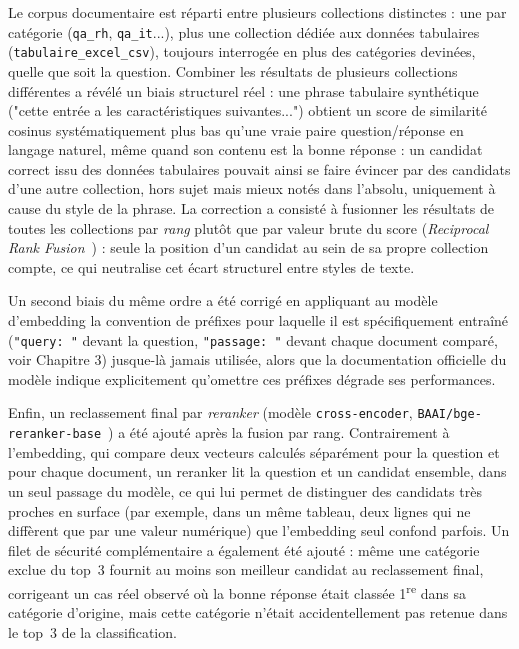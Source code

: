 \documentclass[12pt,a4paper]{report}
\begin{document}
Le corpus documentaire est réparti entre plusieurs collections
distinctes : une par catégorie (\texttt{qa\_rh}, \texttt{qa\_it}...),
plus une collection dédiée aux données tabulaires
(\texttt{tabulaire\_excel\_csv}), toujours interrogée en plus des
catégories devinées, quelle que soit la question. Combiner les
résultats de plusieurs collections différentes a révélé un biais
structurel réel : une phrase tabulaire synthétique ("cette entrée a les
caractéristiques suivantes...") obtient un score de similarité cosinus
systématiquement plus bas qu'une vraie paire question/réponse en
langage naturel, même quand son contenu est la bonne réponse : un
candidat correct issu des données tabulaires pouvait ainsi se faire
évincer par des candidats d'une autre collection, hors sujet mais mieux
notés dans l'absolu, uniquement à cause du style de la phrase. La
correction a consisté à fusionner les résultats de toutes les
collections par \emph{rang} plutôt que par valeur brute du score
(\emph{Reciprocal Rank Fusion}~\cite{rrf}) : seule la position d'un candidat au
sein de sa propre collection compte, ce qui neutralise cet écart
structurel entre styles de texte.

Un second biais du même ordre a été corrigé en appliquant au modèle
d'embedding la convention de préfixes pour laquelle il est
spécifiquement entraîné (\texttt{"query: "} devant la question,
\texttt{"passage: "} devant chaque document comparé, voir Chapitre 3) 
jusque-là jamais utilisée, alors que la documentation officielle du
modèle indique explicitement qu'omettre ces préfixes dégrade ses
performances.

Enfin, un reclassement final par \emph{reranker} (modèle
\texttt{cross-encoder}, \texttt{BAAI/bge-reranker-base}~\cite{bge}) a été ajouté
après la fusion par rang. Contrairement à l'embedding, qui compare deux
vecteurs calculés séparément pour la question et pour chaque document,
un reranker lit la question et un candidat ensemble, dans un seul
passage du modèle, ce qui lui permet de distinguer des candidats très
proches en surface (par exemple, dans un même tableau, deux lignes qui
ne diffèrent que par une valeur numérique) que l'embedding seul confond
parfois. Un filet de sécurité complémentaire a également été ajouté :
même une catégorie exclue du top~3 fournit au moins son meilleur
candidat au reclassement final, corrigeant un cas réel observé où la
bonne réponse était classée 1\textsuperscript{re} dans sa catégorie d'origine, mais
cette catégorie n'était accidentellement pas retenue dans le top~3 de
la classification.
\end{document}
